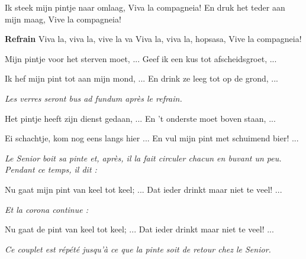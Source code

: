 \footnotemark [
ititle={Viva la compagneia}]


\beginverse
Ik steek mijn pintje naar omlaag,
Viva la compagneia!
En druk het teder aan mijn maag,
Vive la compagneia!
\endverse

\beginchorus
\textbf{Refrain}
Viva la, viva la, vive la va
Viva la, viva la, hopsasa,
Vive la compagneia!
\endchorus

\beginverse
Mijn pintje voor het sterven moet, ...
Geef ik een kus tot afscheidsgroet, ...
\endverse

\beginverse
Ik hef mijn pint tot aan mijn mond, ...
En drink ze leeg tot op de grond, ...
\endverse

\emph{Les verres seront bus ad fundum après le refrain.}

\beginverse
Het pintje heeft zijn dienst gedaan, ...
En 't onderste moet boven staan, ...
\endverse

\beginverse
Ei schachtje, kom nog eens langs hier ...
En vul mijn pint met schuimend bier! ...
\endverse

\emph{Le Senior boit sa pinte et, après, il la fait circuler chacun en buvant un peu. Pendant ce temps, il dit : }

\beginverse
Nu gaat mijn pint van keel tot keel; ...
Dat ieder drinkt maar niet te veel! ...
\endverse

\emph{Et la corona continue :}

\beginverse
Nu gaat de pint van keel tot keel; ...
Dat ieder drinkt maar niet te veel! ...
\endverse

\emph{Ce couplet est répété jusqu'à ce que la pinte soit de retour chez le Senior.}
\endsong